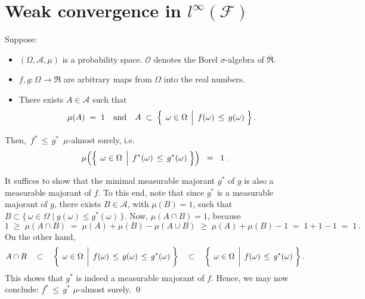 

\section{Weak convergence in $l^{\infty}(\mathcal{F})$}
\setcounter{theorem}{0}
\setcounter{equation}{0}


\renewcommand{\theenumi}{\roman{enumi}}
\renewcommand{\labelenumi}{\textnormal{(\theenumi)}$\;\;$}


\begin{lemma}
\mbox{}\vskip 0.1cm
\noindent
Suppose:
\begin{itemize}
\item
	$(\Omega,\mathcal{A},\mu)$ is a probability space.
	$\mathcal{O}$ denotes the Borel $\sigma$-algebra of $\overline{\Re}$.
\item
	$f, g : \Omega \longrightarrow \Re$ are arbitrary maps from $\Omega$ into the real numbers.
\item
	There exists $A \in \mathcal{A}$ such that
	\begin{equation*}
	\mu(A) \;=\; 1
	\quad\textnormal{and}\quad
	A \;\subset\;\left\{\;
		\left.
		\omega \overset{{\color{white}.}}{\in} \Omega
		\,\;\right\vert\;
			f(\omega) \,\leq\, g(\omega)
		\;\right\}.
	\end{equation*}
\end{itemize}
Then, \,$f^{*} \,\leq\, g^{*}$\, $\mu$-almost surely, i.e.
	\begin{equation*}
	\mu\!\left(\left\{\;
		\left.
		\omega \overset{{\color{white}.}}{\in} \Omega
		\,\;\right\vert\;
			f^{*}(\omega) \,\leq\, g^{*}(\omega)
		\;\right\}\right)
	\;\; = \;\; 1\,.
	\end{equation*}
\end{lemma}
\proof
It suffices to show that the minimal measurable majorant $g^{*}$ of $g$ is also a measurable majorant of $f$.
To this end, note that since $g^{*}$ is a measurable majorant of $g$, there exists $B \in \mathcal{A}$, with
$\mu(B) = 1$, such that $B \subset \{\,\omega\in\Omega\;\vert\;g(\omega)\leq g^{*}(\omega)\,\}$.
Now, $\mu(A \cap B) = 1$, because
\begin{equation*}
1 \;\geq\; \mu(A \cap B) \;=\; \mu(A) + \mu(B) - \mu(A \cup B) \;\geq\; \mu(A) + \mu(B) - 1 \;=\; 1 + 1 - 1 \;=\; 1\,.
\end{equation*}
On the other hand,
\begin{equation*}
A \cap B
\quad\subset\quad
	\left\{\;
	\left.\omega\overset{{\color{white}+}}{\in}\Omega
	\,\;\right\vert\;
	f(\omega) \,\leq\, g(\omega) \,\leq\, g^{*}(\omega)
	\;\right\}
\quad\subset\quad
	\left\{\;
	\left.\omega\overset{{\color{white}+}}{\in}\Omega
	\,\;\right\vert\;
	f(\omega) \,\leq\, g^{*}(\omega)
	\;\right\}.
\end{equation*}
This shows that $g^{*}$ is indeed a measurable majorant of $f$.
Hence, we may now conclude:\; $f^{*} \,\leq\, g^{*}$\; $\mu$-almost surely.
\qed


